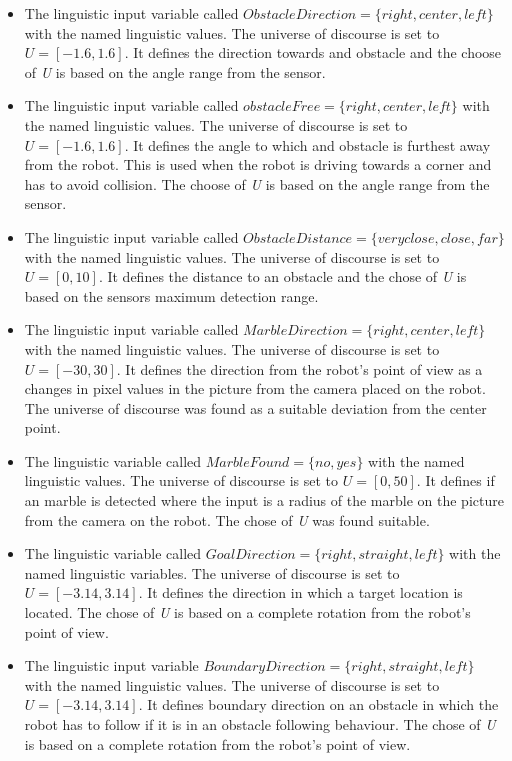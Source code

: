 \documentclass[../Head/Main.tex]{subfiles}
\begin{document}
\begin{itemize}
\item The linguistic input variable called $ObstacleDirection = \{right, center, left\}$ with the named linguistic values. The universe of discourse is set to ${U} = [-1.6, 1.6]$. It defines the direction towards and obstacle and the choose of \textit{U} is based on the angle range from the sensor.   
\item The linguistic input variable called $obstacleFree = \{right, center, left\}$ with the named linguistic values. The universe of discourse is set to ${U} = [-1.6, 1.6]$. It defines the angle to which and obstacle is furthest away from the robot. This is used when the robot is driving towards a corner and has to avoid collision. The choose of \textit{U} is based on the angle range from the sensor.
\item The linguistic input variable called $ObstacleDistance = \{veryclose, close, far\}$ with the named linguistic values.  The universe of discourse is set to ${U} = [0, 10]$. It defines the distance to an obstacle and the chose of \textit{U} is based on the sensors maximum detection range.
\item The linguistic input variable called $MarbleDirection = \{right, center, left\}$ with the named linguistic values. The universe of discourse is set to ${U} = [-30, 30]$. It defines the direction from the robot's point of view as a changes in pixel values in the picture from the camera placed on the robot. The universe of discourse was found as a suitable deviation from the center point.
\item The linguistic variable called $MarbleFound = \{no, yes\}$ with the named linguistic values.  The universe of discourse is set to ${U} = [0, 50]$. It defines if an marble is detected where the input is a radius of the marble on the picture from the camera on the robot. The chose of \textit{U} was found suitable. 
\item The linguistic variable called $GoalDirection = \{right, straight, left\}$ with the named linguistic variables. The universe of discourse is set to ${U} = [-3.14, 3.14]$. It defines the direction in which a target location is located. The chose of \textit{U} is based on a complete rotation from the robot's point of view. 
\item The linguistic input variable $BoundaryDirection = \{right, straight, left\}$ with the named linguistic values. The universe of discourse is set to ${U} = [-3.14, 3.14]$. It defines boundary direction on an obstacle in which the robot has to follow if it is in an obstacle following behaviour. The chose of \textit{U} is based on a complete rotation from the robot's point of view. 

\end{itemize}
\end{document}
